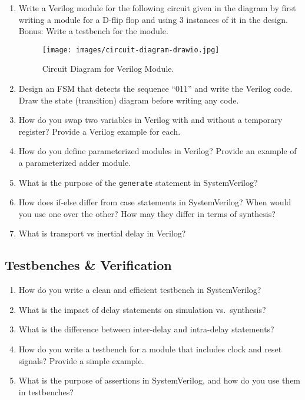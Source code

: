 \documentclass[11pt]{article}
\begin{document}
\begin{enumerate}
    \item Write a Verilog module for the following circuit given in the diagram
    by first writing a module for a D-flip flop and using 3 instances of it in
    the design. Bonus: Write a testbench for the module.
    \begin{figure}[H]
        \centering
        \texttt{[image: images/circuit-diagram-drawio.jpg]}
        \caption{Circuit Diagram for Verilog Module.}
        \label{fig:verilog_circuit}
    \end{figure}
    \item Design an FSM that detects the sequence “011” and write the Verilog
    code. Draw the state (transition) diagram before writing any code.
    \item How do you swap two variables in Verilog with and without a temporary
    register? Provide a Verilog example for each.
    \item How do you define parameterized modules in Verilog? Provide an
    example of a parameterized adder module.
    \item What is the purpose of the \texttt{generate} statement in SystemVerilog?
    \item How does if-else differ from case statements in SystemVerilog? When would you
    use one over the other? How may they differ in terms of synthesis?
    \item What is transport vs inertial delay in Verilog?
\end{enumerate}

\subsection{Testbenches \& Verification}
\begin{enumerate}
    \item How do you write a clean and efficient testbench in SystemVerilog?
    \item What is the impact of delay statements on simulation vs.\ synthesis?
    \item What is the difference between inter-delay and intra-delay
    statements?
    \item How do you write a testbench for a module that includes clock and
    reset signals? Provide a simple example.
    \item What is the purpose of assertions in SystemVerilog, and how do you
    use them in testbenches?
\end{enumerate}
\end{document}
